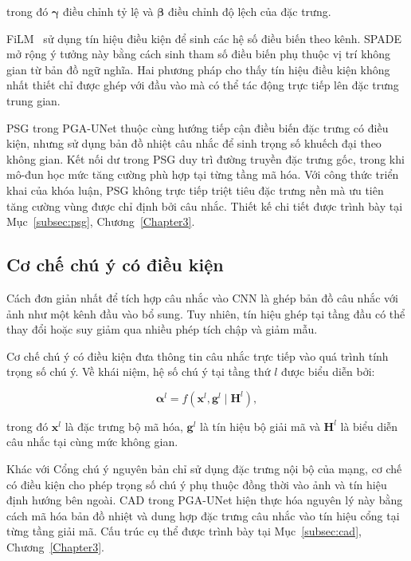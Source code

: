 trong đó $\boldsymbol{\gamma}$ điều chỉnh tỷ lệ và
$\boldsymbol{\beta}$ điều chỉnh độ lệch của đặc trưng.

FiLM~\cite{perez2018film} sử dụng tín hiệu điều kiện để sinh các hệ số điều biến theo kênh. SPADE~\cite{park2019spade} mở rộng ý tưởng này bằng cách sinh tham số điều biến phụ thuộc vị trí không gian từ bản đồ ngữ nghĩa. Hai phương pháp cho thấy tín hiệu điều kiện không nhất thiết chỉ được ghép với đầu vào mà có thể tác động trực tiếp lên đặc trưng trung gian.

PSG trong PGA-UNet thuộc cùng hướng tiếp cận điều biến đặc trưng có điều kiện, nhưng sử dụng bản đồ nhiệt câu nhắc để sinh trọng số khuếch đại theo không gian. Kết nối dư trong PSG duy trì đường truyền đặc trưng gốc, trong khi mô-đun học mức tăng cường phù hợp tại từng tầng mã hóa. Với công thức triển khai của khóa luận, PSG không trực tiếp triệt tiêu đặc trưng nền mà ưu tiên tăng cường vùng được chỉ định bởi câu nhắc. Thiết kế chi tiết được trình bày tại Mục~\ref{subsec:psg}, Chương~\ref{Chapter3}.

\subsection{Cơ chế chú ý có điều kiện}
\label{subsec:conditioned_attention}

Cách đơn giản nhất để tích hợp câu nhắc vào CNN là ghép bản đồ câu nhắc với ảnh như một kênh đầu vào bổ sung. Tuy nhiên, tín hiệu ghép tại tầng đầu có thể thay đổi hoặc suy giảm qua nhiều phép tích chập và giảm mẫu.

Cơ chế chú ý có điều kiện đưa thông tin câu nhắc trực tiếp vào quá trình tính trọng số chú ý. Về khái niệm, hệ số chú ý tại tầng thứ $l$ được biểu diễn bởi:

\begin{equation}
    \boldsymbol{\alpha}^{l}
    =
    f
    \left(
        \mathbf{x}^{l},
        \mathbf{g}^{l}
        \mid
        \mathbf{H}^{l}
    \right),
    \label{eq:conditioned_attention_general}
\end{equation}

trong đó $\mathbf{x}^{l}$ là đặc trưng bộ mã hóa,
$\mathbf{g}^{l}$ là tín hiệu bộ giải mã và
$\mathbf{H}^{l}$ là biểu diễn câu nhắc tại cùng mức không gian.

Khác với Cổng chú ý nguyên bản chỉ sử dụng đặc trưng nội bộ của mạng, cơ chế có điều kiện cho phép trọng số chú ý phụ thuộc đồng thời vào ảnh và tín hiệu định hướng bên ngoài. CAD trong PGA-UNet hiện thực hóa nguyên lý này bằng cách mã hóa bản đồ nhiệt và dung hợp đặc trưng câu nhắc vào tín hiệu cổng tại từng tầng giải mã. Cấu trúc cụ thể được trình bày tại Mục~\ref{subsec:cad}, Chương~\ref{Chapter3}.

